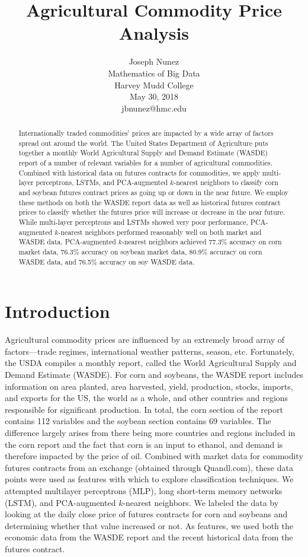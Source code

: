 \documentclass{article}
\title{Agricultural Commodity Price Analysis}
\author{
 Joseph Nunez\\
Mathematics of Big Data\\
Harvey Mudd College\\ 
May 30, 2018\\
jbnunez@hmc.edu}
\begin{document}


\maketitle


\begin{abstract}
Internationally traded commodities' prices are impacted by a wide array of factors spread out around the world.  The United States Department of Agriculture puts together a monthly World Agricultural Supply and Demand Estimate (WASDE) report of a number of relevant variables for a number of agricultural commodities.  Combined with historical data on futures contracts for commodities, we apply multi-layer perceptrons, LSTMs, and PCA-augmented $k$-nearest neighbors to classify corn and soybean futures contract prices as going up or down in the near future.  We employ these methods on both the WASDE report data as well as historical futures contract prices to classify whether the futures price will increase or decrease in the near future.  While multi-layer perceptrons and LSTMs showed very poor performance, PCA-augmented $k$-nearest neighbors performed reasonably well on both market and WASDE data.  PCA-augmented $k$-nearest neighbors achieved 77.3\% accuracy on corn market data, 76.3\% accuracy on soybean market data, 80.9\% accuracy on corn WASDE data, and 76.5\% accuracy on soy WASDE data.

\end{abstract}




\section{Introduction}
Agricultural commodity prices are influenced by an extremely broad array of factors---trade regimes, international weather patterns, season, etc.  Fortunately, the USDA compiles a monthly report, called the World Agricultural Supply and Demand Estimate (WASDE).  For corn and soybeans, the WASDE report includes information on area planted, area harvested, yield, production, stocks, imports, and exports for the US, the world as a whole, and other countries and regions responsible for significant production.  In total, the corn section of the report contains 112 variables and the soybean section contains 69 variables.  The difference largely arises from there being more countries and regions included in the corn report and the fact that corn is an input to ethanol, and demand is therefore impacted by the price of oil.
Combined with market data for commodity futures contracts from an exchange (obtained through Quandl.com), these data points were used as features with which to explore classification techniques.  We attempted multilayer perceptrons (MLP), long short-term memory networks (LSTM), and PCA-augmented $k$-nearest neighbors.
We labeled the data by looking at the daily close price of futures contracts for corn and soybeans and determining whether that value increased or not.  As features, we used both the economic data from the WASDE report and the recent historical data from the futures contract.    
\end{document}
